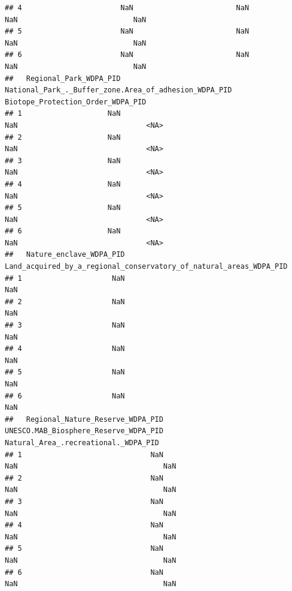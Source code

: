 \documentclass[
]{article}
\begin{document}
\begin{verbatim}
## 4                       NaN                        NaN                     NaN                           NaN
## 5                       NaN                        NaN                     NaN                           NaN
## 6                       NaN                        NaN                     NaN                           NaN
##   Regional_Park_WDPA_PID National_Park_._Buffer_zone.Area_of_adhesion_WDPA_PID Biotope_Protection_Order_WDPA_PID
## 1                    NaN                                                   NaN                              <NA>
## 2                    NaN                                                   NaN                              <NA>
## 3                    NaN                                                   NaN                              <NA>
## 4                    NaN                                                   NaN                              <NA>
## 5                    NaN                                                   NaN                              <NA>
## 6                    NaN                                                   NaN                              <NA>
##   Nature_enclave_WDPA_PID Land_acquired_by_a_regional_conservatory_of_natural_areas_WDPA_PID
## 1                     NaN                                                                NaN
## 2                     NaN                                                                NaN
## 3                     NaN                                                                NaN
## 4                     NaN                                                                NaN
## 5                     NaN                                                                NaN
## 6                     NaN                                                                NaN
##   Regional_Nature_Reserve_WDPA_PID UNESCO.MAB_Biosphere_Reserve_WDPA_PID Natural_Area_.recreational._WDPA_PID
## 1                              NaN                                   NaN                                  NaN
## 2                              NaN                                   NaN                                  NaN
## 3                              NaN                                   NaN                                  NaN
## 4                              NaN                                   NaN                                  NaN
## 5                              NaN                                   NaN                                  NaN
## 6                              NaN                                   NaN                                  NaN

\end{verbatim}
\end{document}

